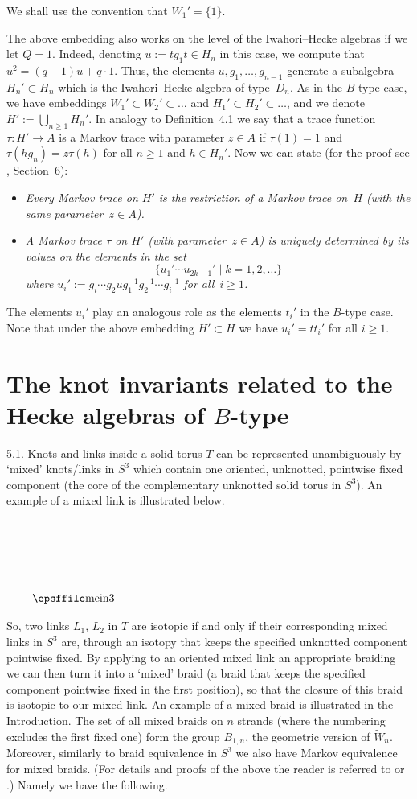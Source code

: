 \noindent We shall use the convention that $W_1'=\{1\}$.

The above embedding also works on the level of the Iwahori--Hecke algebras if
we let $Q=1$. Indeed, denoting $u:=tg_1t \in H_n$ in this case, we compute
that $u^2=(q-1)u+q \cdot 1$. Thus, the elements $u,g_1,\ldots,g_{n-1}$
generate a subalgebra $H_n' \subset H_n$ which is the Iwahori--Hecke algebra
of type~$D_n$. As in the $B$-type case, we have embeddings $W_1' \subset W_2'
\subset \ldots$ and $H_1' \subset H_2' \subset \ldots$, and we denote $H':=
\bigcup_{n \geq 1} H_n'$. In analogy to Definition~4.1 we say that a trace 
function $\tau:H' \rightarrow A$ is a Markov trace with parameter $z \in A$ if
$\tau(1)=1$ and $\tau(hg_n)=z\tau(h)$ for all $n \geq 1$ and $h \in H_n'$. Now 
we can state (for the proof see \cite{G}, Section~6):
\begin{itemize}
\item[(a)] {\em Every Markov trace on $H'$ is the restriction of a Markov
trace on~$H$ (with the same parameter~$z \in A$).}
\item[(b)] {\em A Markov trace $\tau$ on $H'$ (with parameter~$z \in A$) is
uniquely determined by its values on the elements in the set 
\[ \{u_1' \cdots u_{2k-1}' \mid k=1,2,\ldots \}\]
where $u_i':=g_i \cdots g_2ug_1^{-1}g_2^{-1} \cdots g_i^{-1}$ for all~$i \geq 1$.}
\end{itemize}
The elements $u_i'$ play an analogous role as the elements $t_i'$ in the 
$B$-type case. Note that under the above embedding $H' \subset H$ we have
$u_i'=tt_i'$ for all $i \geq 1$.

\section{The knot invariants related to the Hecke algebras of $B$-type}

5.1.  Knots  and links  inside  a solid  torus $T$ can be represented  
unambiguously  by  `mixed' knots/links   in  $S^3$  which contain one 
oriented,  unknotted, pointwise fixed  component (the core of the 
complementary unknotted solid torus in $S^3$).  An example of a
mixed link is illustrated below.

$$\vbox{\picill1.7inby1in(mein3)  }$$ 

\noindent So, two links  $L_1$, $L_2$ in  $T$ are isotopic  if and only 
if their corresponding mixed  links in $S^3$  are, through an  isotopy
that  keeps the  specified unknotted  component  pointwise fixed.   By
applying to an oriented mixed link an  appropriate braiding we can then
turn it   into a `mixed'   braid  (a braid  that   keeps the specified
component pointwise fixed in the first position),  so that the closure
of this  braid is isotopic  to our mixed  link. An example of  a mixed
braid  is illustrated in the Introduction.  The set of  all  mixed braids on $n$
strands (where  the numbering excludes the first   fixed one) form the
group $B_{1,n}$, the   geometric version of  $\tilde{W}_n$.  Moreover,
similarly to  braid equivalence    in   $S^3$ we also    have   Markov
equivalence for mixed braids. (For details and proofs of the above the
reader is  referred to  \cite{L1} or \cite{L2}.)  Namely we  have  the
following.

